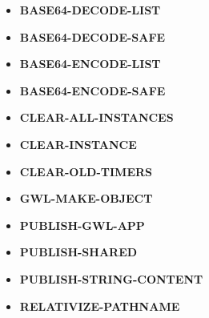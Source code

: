 \documentclass [11pt]{book}
\begin{document}
\begin{itemize}

\item {}
\textbf{BASE64-DECODE-LIST}





\item {}
\textbf{BASE64-DECODE-SAFE}





\item {}
\textbf{BASE64-ENCODE-LIST}





\item {}
\textbf{BASE64-ENCODE-SAFE}





\item {}
\textbf{CLEAR-ALL-INSTANCES}





\item {}
\textbf{CLEAR-INSTANCE}





\item {}
\textbf{CLEAR-OLD-TIMERS}





\item {}
\textbf{GWL-MAKE-OBJECT}





\item {}
\textbf{PUBLISH-GWL-APP}





\item {}
\textbf{PUBLISH-SHARED}





\item {}
\textbf{PUBLISH-STRING-CONTENT}





\item {}
\textbf{RELATIVIZE-PATHNAME}






\end{itemize}
\end{document}

